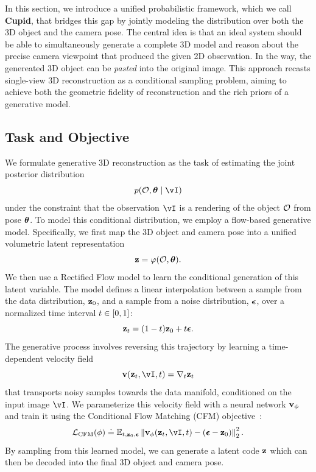 \documentclass[../../book-main.tex]{subfiles}
\begin{document}
In this section, we introduce a unified probabilistic framework, which we call \textbf{Cupid}, that bridges this gap by jointly modeling the distribution over both the 3D object and the camera pose. The central idea is that an ideal system should be able to simultaneously generate a complete 3D model and reason about the precise camera viewpoint that produced the given 2D observation. In the way, the genereated 3D object can be \textit{pasted} into the original image. This approach recasts single-view 3D reconstruction as a conditional sampling problem, aiming to achieve both the geometric fidelity of reconstruction and the rich priors of a generative model.


\subsection{Task and Objective}
\label{sub:cupid_objective}

We formulate generative 3D reconstruction as the task of estimating the joint posterior distribution
\[
p(\object, \pose \mid \image)
\]
under the constraint that the observation $\image$ is a rendering of the object $\mathcal{O}$ from pose $\boldsymbol{\theta}$. To model this conditional distribution, we employ a flow-based generative model. Specifically, we first map the 3D object and camera pose into a unified volumetric latent representation
\[
\mathbf{z} = \varphi(\mathcal{O}, \boldsymbol{\theta}).
\]
We then use a Rectified Flow model to learn the conditional generation of this latent variable. The model defines a linear interpolation between a sample from the data distribution, $\mathbf{z}_{0}$, and a sample from a noise distribution, $\boldsymbol{\epsilon}$, over a normalized time interval $t \in [0,1]$:
\begin{equation}
\mathbf{z}_{t} = (1 - t) \mathbf{z}_{0} + t \boldsymbol{\epsilon}.
\end{equation}
The generative process involves reversing this trajectory by learning a time-dependent velocity field
\[
\velocity(\latentt, \image, \timestep) = \nabla_{\timestep} \latentt
\]
that transports noisy samples towards the data manifold, conditioned on the input image $\image$. We parameterize this velocity field with a neural network $\mathbf{v}_{\phi}$ and train it using the Conditional Flow Matching (CFM) objective~\cite{bib}:
\begin{equation}
\mathcal{L}_{\mathrm{CFM}}(\parameter) \doteq \mathbb{E}_{\timestep, \latentzero, \noise} \left\| \velocity_{\parameter}(\latentt, \image, \timestep) - (\noise - \latentzero) \right\|_{2}^{2}.
\end{equation}
By sampling from this learned model, we can generate a latent code $\mathbf{z}$ which can then be decoded into the final 3D object and camera pose.
\end{document}
